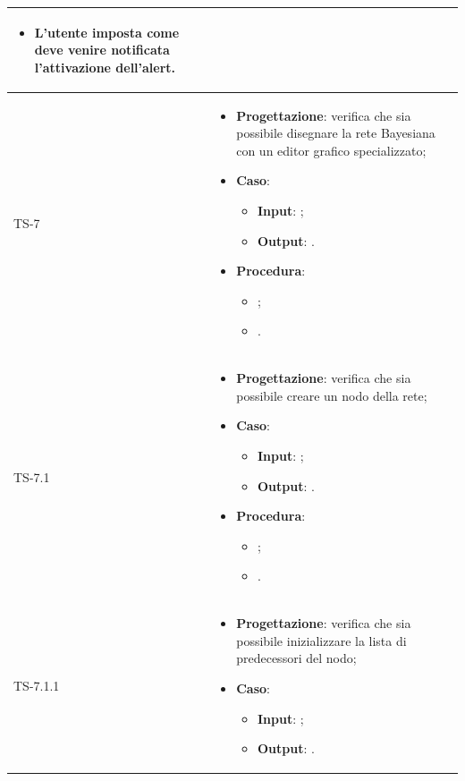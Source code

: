 \begin{longtable}{|C{2.5cm}|C{13cm}|}
\begin{itemize}
\begin{itemize}
		\item L'utente imposta come deve venire notificata l'attivazione dell'alert.
	\end{itemize} 
\end{itemize}
	 \\
	\hline
	{TS-7} & 
\begin{itemize}
	\item \textbf{Progettazione}: verifica che sia possibile disegnare la rete
	Bayesiana con un editor grafico specializzato;
	\item \textbf{Caso}: 
	\begin{itemize}
		\item \textbf{Input}: ;
		\item \textbf{Output}: .
	\end{itemize}
	\item \textbf{Procedura}:
	\begin{itemize}
		\item ;
		\item .
	\end{itemize} 
\end{itemize}
	\\
	\hline
	{TS-7.1} & 
\begin{itemize}
	\item \textbf{Progettazione}: verifica che sia possibile creare un nodo
	della rete;
	\item \textbf{Caso}: 
	\begin{itemize}
		\item \textbf{Input}: ;
		\item \textbf{Output}: .
	\end{itemize}
	\item \textbf{Procedura}:
	\begin{itemize}
		\item ;
		\item .
	\end{itemize} 
\end{itemize}
	  \\
	\hline
	{TS-7.1.1} &
\begin{itemize}
	\item \textbf{Progettazione}: verifica che sia  possibile inizializzare la lista di predecessori del nodo;
	\item \textbf{Caso}: 
	\begin{itemize}
		\item \textbf{Input}: ;
		\item \textbf{Output}: .
	\end{itemize}

\end{itemize}
\end{longtable}
